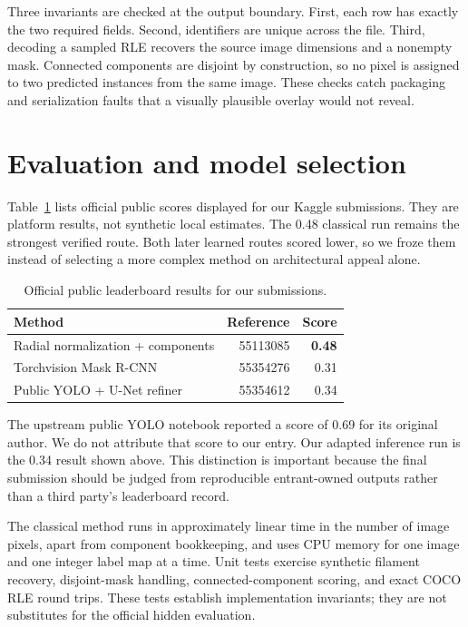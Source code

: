 \documentclass[sigconf]{acmart}
\begin{document}
Three invariants are checked at the output boundary. First, each row has exactly
the two required fields. Second, identifiers are unique across the file. Third,
decoding a sampled RLE recovers the source image dimensions and a nonempty mask.
Connected components are disjoint by construction, so no pixel is assigned to
two predicted instances from the same image. These checks catch packaging and
serialization faults that a visually plausible overlay would not reveal.

\section{Evaluation and model selection}\label{sec:evaluation}
Table~\ref{tab:results} lists official public scores displayed for our Kaggle
submissions. They are platform results, not synthetic local estimates. The
0.48 classical run remains the strongest verified route. Both later learned
routes scored lower, so we froze them instead of selecting a more complex
method on architectural appeal alone.

\begin{table}[h]
\caption{Official public leaderboard results for our submissions.}
\label{tab:results}
\centering
\small
\begin{tabular}{@{}p{}rr@{}}
\toprule
Method & Reference & Score \\
\midrule
Radial normalization + components & 55113085 & \textbf{0.48} \\
Torchvision Mask R-CNN & 55354276 & 0.31 \\
Public YOLO + U-Net refiner & 55354612 & 0.34 \\
\bottomrule
\end{tabular}
\end{table}

The upstream public YOLO notebook reported a score of 0.69 for its original
author. We do not attribute that score to our entry. Our adapted inference run
is the 0.34 result shown above. This distinction is important because the final
submission should be judged from reproducible entrant-owned outputs rather
than a third party's leaderboard record.

The classical method runs in approximately linear time in the number of image
pixels, apart from component bookkeeping, and uses CPU memory for one image and
one integer label map at a time. Unit tests exercise synthetic filament
recovery, disjoint-mask handling, connected-component scoring, and exact COCO
RLE round trips. These tests establish implementation invariants; they are not
substitutes for the official hidden evaluation.
\end{document}
